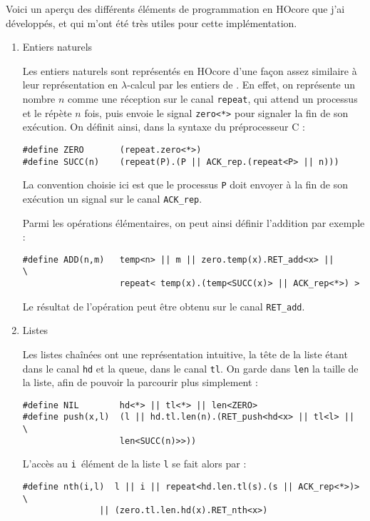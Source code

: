 \documentclass[11pt]{article}
\begin{document}
Voici un aperçu des différents éléments de programmation en HOcore que j'ai développés, et qui m'ont été très utiles pour cette implémentation.

\begin{enumerate}
\item Entiers naturels
\label{sec-4-2-2-1}

Les entiers naturels sont représentés en HOcore d'une façon assez similaire à leur représentation en $\lambda$-calcul par les entiers de .
En effet, on représente un nombre $n$ comme une réception sur le canal \verb|repeat|, qui attend un processus et le répète $n$ fois, puis envoie le signal \verb|zero<*>| pour signaler la fin de son exécution.
On définit ainsi, dans la syntaxe du préprocesseur C :
\begin{verbatim}
#define ZERO       (repeat.zero<*>)
#define SUCC(n)    (repeat(P).(P || ACK_rep.(repeat<P> || n)))
\end{verbatim}

La convention choisie ici est que le processus \verb|P| doit envoyer à la fin de son exécution un signal sur le canal \verb|ACK_rep|.

Parmi les opérations élémentaires, on peut ainsi définir l'addition par exemple :
\begin{verbatim}
#define ADD(n,m)   temp<n> || m || zero.temp(x).RET_add<x> ||       \
                   repeat< temp(x).(temp<SUCC(x)> || ACK_rep<*>) >
\end{verbatim}

Le résultat de l'opération peut être obtenu sur le canal \verb|RET_add|.

\item Listes
\label{sec-4-2-2-2}

Les listes chaînées ont une représentation intuitive, la tête de la liste étant dans le canal \verb|hd| et la queue, dans le canal \verb|tl|.
On garde dans \verb|len| la taille de la liste, afin de pouvoir la parcourir plus simplement :
\begin{verbatim}
#define NIL        hd<*> || tl<*> || len<ZERO>
#define push(x,l)  (l || hd.tl.len(n).(RET_push<hd<x> || tl<l> ||   \
                   len<SUCC(n)>>))
\end{verbatim}

L'accès au \verb|i|\ieme\ élément de la liste \verb|l| se fait alors par :
\begin{verbatim}
#define nth(i,l)  l || i || repeat<hd.len.tl(s).(s || ACK_rep<*>)>  \
               || (zero.tl.len.hd(x).RET_nth<x>)
\end{verbatim}


\end{enumerate}
\end{document}
